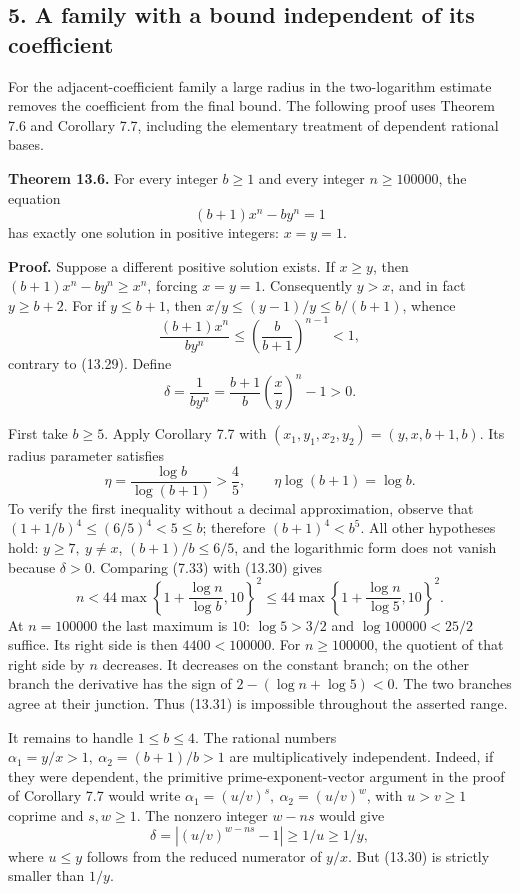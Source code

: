 \documentclass[
  11pt,
  a4paper,
]{article}
\begin{document}
\subsection{5. A family with a bound independent of its
coefficient}\label{a-family-with-a-bound-independent-of-its-coefficient}

For the adjacent-coefficient family a large radius in the two-logarithm
estimate removes the coefficient from the final bound. The following
proof uses Theorem 7.6 and Corollary 7.7, including the elementary
treatment of dependent rational bases.

\textbf{Theorem 13.6.} For every integer \(b\ge1\) and every integer
\(n\ge100000\), the equation \[
(b+1)x^n-by^n=1
\tag{13.29}
\] has exactly one solution in positive integers: \(x=y=1\).

\textbf{Proof.} Suppose a different positive solution exists. If
\(x\ge y\), then \((b+1)x^n-by^n\ge x^n\), forcing \(x=y=1\).
Consequently \(y>x\), and in fact \(y\ge b+2\). For if \(y\le b+1\),
then \(x/y\le(y-1)/y\le b/(b+1)\), whence \[
\frac{(b+1)x^n}{by^n}
\le\left(\frac b{b+1}\right)^{n-1}<1,
\] contrary to (13.29). Define \[
\delta=\frac1{by^n}
=\frac{b+1}{b}\left(\frac xy\right)^n-1>0.
\tag{13.30}
\]

First take \(b\ge5\). Apply Corollary 7.7 with
\((x_1,y_1,x_2,y_2)=(y,x,b+1,b)\). Its radius parameter satisfies \[
\eta=\frac{\log b}{\log(b+1)}>\frac45,\qquad
\eta\log(b+1)=\log b.
\] To verify the first inequality without a decimal approximation,
observe that \((1+1/b)^4\le(6/5)^4<5\le b\); therefore \((b+1)^4<b^5\).
All other hypotheses hold: \(y\ge7,\ y\ne x\), \((b+1)/b\le6/5\), and
the logarithmic form does not vanish because \(\delta>0\). Comparing
(7.33) with (13.30) gives \[
n<44\max\left\{1+\frac{\log n}{\log b},10\right\}^{2}
\le44\max\left\{1+\frac{\log n}{\log5},10\right\}^{2}.
\tag{13.31}
\] At \(n=100000\) the last maximum is \(10\): \(\log5>3/2\) and
\(\log100000<25/2\) suffice. Its right side is then \(4400<100000\). For
\(n\ge100000\), the quotient of that right side by \(n\) decreases. It
decreases on the constant branch; on the other branch the derivative has
the sign of \(2-(\log n+\log5)<0\). The two branches agree at their
junction. Thus (13.31) is impossible throughout the asserted range.

It remains to handle \(1\le b\le4\). The rational numbers
\(\alpha_1=y/x>1,\ \alpha_2=(b+1)/b>1\) are multiplicatively
independent. Indeed, if they were dependent, the primitive
prime-exponent-vector argument in the proof of Corollary 7.7 would write
\(\alpha_1=(u/v)^s,\ \alpha_2=(u/v)^w\), with \(u>v\ge1\) coprime and
\(s,w\ge1\). The nonzero integer \(w-ns\) would give \[
\delta=|(u/v)^{w-ns}-1|\ge1/u\ge1/y,
\] where \(u\le y\) follows from the reduced numerator of \(y/x\). But
(13.30) is strictly smaller than \(1/y\).
\end{document}
